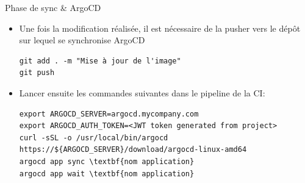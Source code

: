 
\begin{frame}[fragile]{Phase de sync \& ArgoCD}

\begin{itemize}
   \item Une fois la modification réalisée, il est nécessaire de la pusher vers le dépôt sur lequel se synchronise ArgoCD
\begin{tiny}
\begin{Verbatim}[commandchars=\&\{\}]
git add . -m "Mise à jour de l'image"
git push
\end{Verbatim}
\end{tiny}
   \item Lancer ensuite les commandes suivantes dans le pipeline de la CI:
\begin{tiny}
\begin{Verbatim}[commandchars=\\\{\}]
export ARGOCD_SERVER=argocd.mycompany.com
export ARGOCD_AUTH_TOKEN=<JWT token generated from project>
curl -sSL -o /usr/local/bin/argocd https://${ARGOCD_SERVER}/download/argocd-linux-amd64
argocd app sync \textbf{nom application}
argocd app wait \textbf{nom application}
\end{Verbatim}
\end{tiny}
\end{itemize}

\end{frame}


